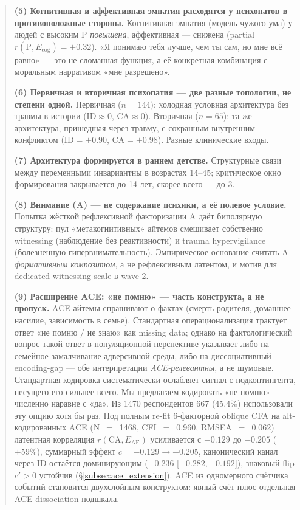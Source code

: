 \documentclass[11pt,a4paper]{article}
\newcommand{\EAF}{\ensuremath{E_{\mathrm{AF}}}}
\begin{document}
\begin{abstract}
\noindent\textbf{(5) Когнитивная и аффективная эмпатия расходятся у психопатов в противоположные стороны.} Когнитивная эмпатия (модель чужого ума) у людей с высоким P \emph{повышена}, аффективная --- снижена (partial $r(\text{P}, E_{\mathrm{cog}}) = +0.32$). «Я понимаю тебя лучше, чем ты сам, но мне всё равно» --- это не сломанная функция, а её конкретная комбинация с моральным нарративом «мне разрешено».

\noindent\textbf{(6) Первичная и вторичная психопатия --- две разные топологии, не степени одной.} Первичная ($n = 144$): холодная условная архитектура без травмы в истории (ID$\approx$0, CA$\approx$0). Вторичная ($n = 65$): та же архитектура, пришедшая через травму, с сохранным внутренним конфликтом (ID$=+0.90$, CA$=+0.98$). Разные клинические входы.

\noindent\textbf{(7) Архитектура формируется в раннем детстве.} Структурные связи между переменными инвариантны в возрастах 14--45; критическое окно формирования закрывается до 14 лет, скорее всего --- до 3.

\noindent\textbf{(8) Внимание (A) --- не содержание психики, а её полевое условие.} Попытка жёсткой рефлексивной факторизации A даёт биполярную структуру: пул «метакогнитивных» айтемов смешивает собственно witnessing (наблюдение без реактивности) и trauma hypervigilance (болезненную гипервнимательность). Эмпирическое основание считать A \emph{формативным композитом}, а не рефлексивным латентом, и мотив для dedicated witnessing-scale в wave 2.

\noindent\textbf{(9) Расширение ACE: «не помню» --- часть конструкта, а не пропуcк.} ACE-айтемы спрашивают о фактах (смерть родителя, домашнее насилие, зависимость в семье). Стандартная операционализация \citep{felitti1998} трактует ответ «не помню / не знаю» как missing data; однако на фактологический вопрос такой ответ в популяционной перспективе указывает либо на семейное замалчивание адверсивной среды, либо на диссоциативный encoding-gap --- обе интерпретации \emph{ACE-релевантны}, а не шумовые. Стандартная кодировка систематически ослабляет сигнал с подконтингента, несущего его сильнее всего. Мы предлагаем кодировать «не помню» численно наравне с «да». Из 1470 респондентов 667 (45.4\%) использовали эту опцию хотя бы раз. Под полным re-fit 6-факторной oblique CFA на alt-кодированных ACE (N~$=$~1468, CFI~$=$~0.960, RMSEA~$=$~0.062) латентная корреляция $r(\text{CA}, \EAF{})$ усиливается с $-0.129$ до $-0.205$ ($+59\%$), суммарный эффект $c = -0.129 \to -0.205$, канонический канал через ID остаётся доминирующим ($-0.236$ [$-0.282, -0.192$]), знаковый flip $c' > 0$ устойчив (§\ref{subsec:ace_extension}). ACE из одномерного счётчика событий становится двухслойным конструктом: явный счёт плюс отдельная ACE-dissociation подшкала.


\end{abstract}
\end{document}
